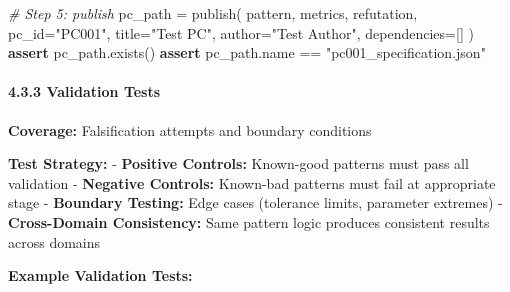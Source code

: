 \documentclass[
]{article}
\newenvironment{Shaded}{}{}
\newcommand{\CommentTok}[1]{\textcolor[rgb]{0.38,0.63,0.69}{\textit{#1}}}
\newcommand{\ControlFlowTok}[1]{\textcolor[rgb]{0.00,0.44,0.13}{\textbf{#1}}}
\newcommand{\NormalTok}[1]{#1}
\newcommand{\OperatorTok}[1]{\textcolor[rgb]{0.40,0.40,0.40}{#1}}
\newcommand{\StringTok}[1]{\textcolor[rgb]{0.25,0.44,0.63}{#1}}
\begin{document}
\begin{Shaded}
\begin{Highlighting}[]
    \CommentTok{\# Step 5: publish}
\NormalTok{    pc\_path }\OperatorTok{=}\NormalTok{ publish(}
\NormalTok{        pattern,}
\NormalTok{        metrics,}
\NormalTok{        refutation,}
\NormalTok{        pc\_id}\OperatorTok{=}\StringTok{"PC001"}\NormalTok{,}
\NormalTok{        title}\OperatorTok{=}\StringTok{"Test PC"}\NormalTok{,}
\NormalTok{        author}\OperatorTok{=}\StringTok{"Test Author"}\NormalTok{,}
\NormalTok{        dependencies}\OperatorTok{=}\NormalTok{[]}
\NormalTok{    )}
    \ControlFlowTok{assert}\NormalTok{ pc\_path.exists()}
    \ControlFlowTok{assert}\NormalTok{ pc\_path.name }\OperatorTok{==} \StringTok{"pc001\_specification.json"}
\end{Highlighting}
\end{Shaded}

\paragraph{4.3.3 Validation Tests}\label{validation-tests}

\textbf{Coverage:} Falsification attempts and boundary conditions

\textbf{Test Strategy:} - \textbf{Positive Controls:} Known-good
patterns must pass all validation - \textbf{Negative Controls:}
Known-bad patterns must fail at appropriate stage - \textbf{Boundary
Testing:} Edge cases (tolerance limits, parameter extremes) -
\textbf{Cross-Domain Consistency:} Same pattern logic produces
consistent results across domains

\textbf{Example Validation Tests:}
\end{document}
